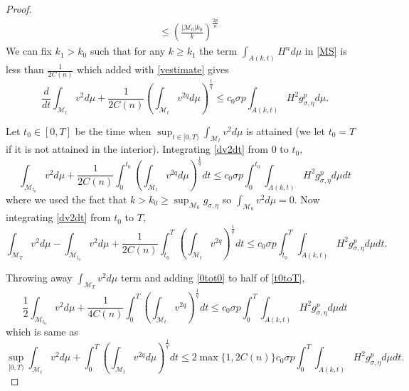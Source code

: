 \begin{proof}
\begin{align*}
            & \le \left( \frac{|\mathcal{M}_{0}|k_{0}}{k} \right)^{\frac{2p}{n}}
        \end{align*}
        We can fix $ k_{1} > k_{0} $ such that for any $ k \ge k_{1} $ the term $ \int_{A(k,t)}H^{n}d \mu $  in \cref{MS} is less than $ \frac{1}{2C(n)} $ which added with \cref{vestimate} gives
        \begin{equation}
            \frac{d}{dt}\int_{\mathcal{M}_{t}} v^{2}d \mu + \frac{1}{2C(n)}\left( \int_{\mathcal{M}_{t}}v^{2q}d \mu \right)^{\frac{1}{q}} \le c_{0} \sigma p \int_{A(k,t)} H^{2}g_{\sigma, \eta}^{p} d \mu \label{dv2dt}.
        \end{equation}

        Let $ t_{0} \in [0,T] $ be the time when $ \sup_{t \in [0,T)} \int_{\mathcal{M}_{t}} v^{2} d \mu $ is attained (we let $ t_{0}=T $ if it is not attained in the interior). Integrating \cref{dv2dt} from $ 0 $ to $ t_{0} $, \begin{equation}
            \int_{\mathcal{M}_{t_{0}}} v^{2}d \mu+ \frac{1}{2C(n)} \int_{0}^{t_{0}} \left( \int_{\mathcal{M}_{t}}v^{2q} d \mu\right)^{\frac{1}{q}}dt \le c_{0} \sigma p \int_{0}^{t_{0}} \int_{A(k,t)}H^{2}g_{\sigma,\eta}^{p}d \mu dt \label{0tot0}
        \end{equation}
        where we used the fact that $ k>k_{0} \ge \sup_{\mathcal{M}_{0}}g_{\sigma,\eta} $ so $ \int_{\mathcal{M}_{0}}v^{2}d \mu = 0 $. Now integrating \cref{dv2dt} from $ t_{0} $ to $ T $, \begin{equation}
            \int_{\mathcal{M}_{T}}v^{2}d \mu - \int_{\mathcal{M}_{t_{0}}} v^{2}d \mu + \frac{1}{2C(n)} \int_{t_{0}}^{T} \left( \int_{\mathcal{M}_{t}}v^{2q} \right)^{\frac{1}{q}} dt \le c_{0}\sigma p \int_{t_{0}}^{T} \int_{A(k,t)} H^{2}g_{\sigma,\eta}^{p} d \mu dt \label{t0toT}.
        \end{equation}

        Throwing away $ \int_{\mathcal{M}_{T}}v^{2}d \mu $ term and adding \cref{0tot0} to half of \cref{t0toT}, \begin{equation*}
            \frac{1}{2} \int_{\mathcal{M}_{t_{0}}}v^{2}d \mu + \frac{1}{4C(n)}\int_{0}^{T}\left( \int_{\mathcal{M}_{t}}v^{2q} \right)^{\frac{1}{q}}dt \le c_{0} \sigma p \int_{0}^{T} \int_{A(k,t)}H^{2}g_{\sigma,\eta}^{p}d \mu dt
        \end{equation*}
        which is same as \begin{equation}
            \sup_{[0,T)} \int_{\mathcal{M}_{t}}v^{2}d \mu +  \int_{0}^{T} \left(\int_{\mathcal{M}_{t}} v^{2q}d \mu \right)^{\frac{1}{q}}dt \le 2\max\{1,2C(n)\}c_{0} \sigma p \int_{0}^{T}\int_{A(k,t)}H^{2}g_{\sigma,\eta}^{p}d \mu dt. \label{supineq}
        \end{equation}


\end{proof}
